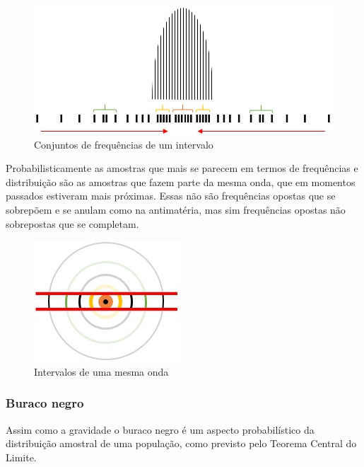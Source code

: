 \begin{figure}[H]
\caption{Conjuntos de frequências de um intervalo}
\label{fig:consciousness_coexistence}
\centering
\includegraphics[scale=1]{sections/images/consciousness_coexistence.jpg}
\end{figure}

Probabilisticamente as amostras que mais se parecem em termos de frequências e distribuição são as amostras que fazem parte da mesma onda, que em momentos passados estiveram mais próximas. Essas não são frequências opostas que se sobrepõem e se anulam como na antimatéria, mas sim frequências opostas não sobrepostas que se completam.

\begin{figure}[H]
\caption{Intervalos de uma mesma onda}
\label{fig:consciousness_coexistence_waves}
\centering
\includegraphics[scale=1]{sections/images/consciousness_coexistence_waves.jpg}
\end{figure}

\subsubsection{Buraco negro}
Assim como a gravidade o buraco negro é um aspecto probabilístico da distribuição amostral de uma população, como previsto pelo Teorema Central do Limite. 

